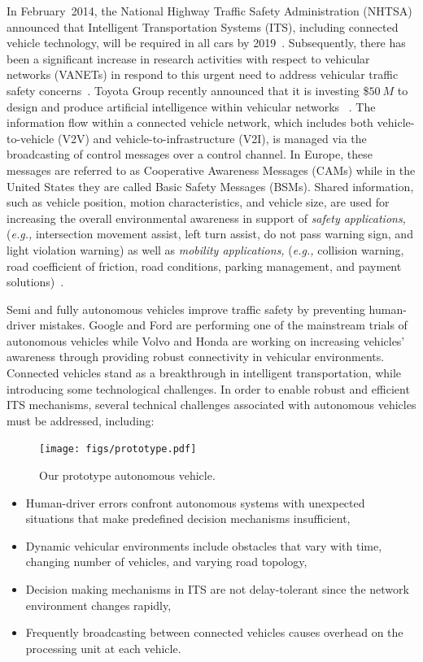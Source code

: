 \documentclass[journal, 11pt]{IEEEtran}
\begin{document}
In February~2014, the National Highway Traffic Safety Administration (NHTSA)
announced that Intelligent Transportation Systems (ITS), including connected
vehicle technology, will be required in all cars by 2019~\cite{factsheet}.
Subsequently, there has been a significant increase in research activities with
respect to vehicular networks (VANETs) in respond to this urgent need to
address vehicular traffic safety concerns~\cite{ntsb}. Toyota Group recently
announced that it is investing \$$50~M$ to design and produce artificial
intelligence within vehicular networks ~\cite{toyota50M}. The information flow
within a connected vehicle network, which includes both vehicle-to-vehicle (V2V)
and vehicle-to-infrastructure (V2I), is managed via the broadcasting of control
messages over a control channel. In Europe, these messages are referred to as
Cooperative Awareness Messages (CAMs) while in the United States they are called
Basic Safety Messages (BSMs). Shared information, such as vehicle position,
motion characteristics, and vehicle size, are used for increasing the overall
environmental awareness in support of \textit{safety applications,}
(\textit{e.g.,} intersection movement assist, left turn assist, do not pass
warning sign, and light violation warning) as well as \textit{mobility
applications,} (\textit{e.g.,} collision warning, road coefficient of friction,
road conditions, parking management, and payment
solutions)~\cite{hardingNHTSA14}.

Semi and fully autonomous vehicles improve traffic safety by preventing
human-driver mistakes. Google and Ford are performing one of the mainstream
trials of autonomous vehicles while Volvo and Honda are working on increasing
vehicles' awareness through providing robust connectivity in vehicular
environments. Connected vehicles stand as a breakthrough in intelligent
transportation, while introducing some technological challenges. In order to
enable robust and efficient ITS mechanisms, several technical challenges
associated with autonomous vehicles must be addressed, including:

\begin{figure}[!t]
  \centering
  \texttt{[image: figs/prototype.pdf]}
  \vspace*{-2mm}
  \caption{{\fontsize{10}{10}\selectfont Our prototype autonomous vehicle.}}
  \label{fig:pareto}
  \vspace*{-6mm}
\end{figure}

\begin{itemize}
\item Human-driver errors confront autonomous systems with unexpected
situations that make predefined decision mechanisms insufficient,
\item Dynamic vehicular environments include obstacles that vary with time,
changing number of vehicles, and varying road topology,
\item Decision making mechanisms in ITS are not delay-tolerant since the network
environment changes rapidly,
\item Frequently broadcasting between connected vehicles causes overhead on the
processing unit at each vehicle.
\end{itemize}
\end{document}
